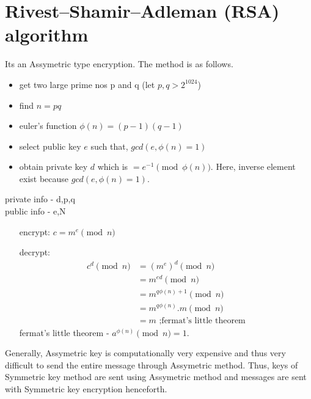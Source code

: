 \documentclass[english, 11pt]{article}
\begin{document}
\begin{figure}[ht]


  \centering   
\end{figure}

\section*{Rivest–Shamir–Adleman (RSA) algorithm}
Its an Assymetric type encryption. The method is as follows.
\begin{itemize}
  \item get two large prime nos p and q (let $p,q > 2^{1024}$)
  \item find $n = pq$
  \item euler's function $\phi(n) = (p-1)(q-1)$
  \item select public key $e$ such that, $gcd(e,\phi(n) = 1)$
  \item obtain private key $d$ which is $= e^{-1} \pmod{\phi(n)} $. Here, inverse element exist because $gcd(e,\phi(n) = 1)$.
\end{itemize}
private info - d,p,q \\
public info - e,N
\begin{itemize}
  \item[encrypt:] $c = m^e \pmod{n}$
  \item[decrypt:] 
  \begin{align*}
    c^d \pmod{n} &= (m^e)^d \pmod{n} \\
    &= m^{ed} \pmod{n} \\
    &= m^{q\phi(n) + 1} \pmod{n} \\
    &= m^{q\phi(n)}.m \pmod{n} \\
    &= m \text{      ;fermat's little theorem}
  \end{align*}
  fermat's little theorem - $a^{\phi(n)} \pmod{n} = 1$.
\end{itemize}
Generally, Assymetric key is computationally very expensive and thus very difficult to send the entire message through Assymetric method. Thus, keys of Symmetric key method are sent using Assymetric method and messages are sent with Symmetric key encryption henceforth.
\end{document}
